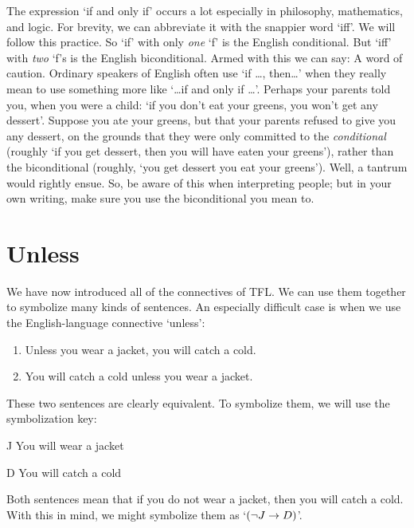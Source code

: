 The expression `if and only if' occurs a lot especially in philosophy, mathematics, and logic. For brevity, we can abbreviate it with the snappier word `iff'. We will follow this practice. So `if' with only \emph{one} `f' is the English conditional. But `iff' with \emph{two} `f's is the English biconditional. Armed with this we can say:
A word of caution. Ordinary speakers of English often use `if \ldots, then\ldots' when they really mean to use something more like `\ldots if and only if \ldots'. Perhaps your parents told you, when you were a child: `if you don't eat your greens, you won't get any dessert'. Suppose you ate your greens, but that your parents refused to give you any dessert, on the grounds that they were only committed to the \emph{conditional} (roughly `if you get dessert, then you will have eaten your greens'), rather than the biconditional (roughly, `you get dessert \ifeff{} you eat your greens'). Well, a tantrum would rightly ensue. So, be aware of this when interpreting people; but in your own writing, make sure you use the biconditional \ifeff{} you mean to.

\section{Unless}
We have now introduced all of the connectives of TFL. We can use them together to symbolize many kinds of sentences. An especially difficult case is when we use the English-language connective `unless':

\begin{enumerate}
\item\label{unless1} Unless you wear a jacket, you will catch a cold.
\item\label{unless2} You will catch a cold unless you wear a jacket.
\end{enumerate}
These two sentences are clearly equivalent. To symbolize them, we will use the symbolization key:
	\begin{ekey}
		\item[J] You will wear a jacket
		\item[D] You will catch a cold
	\end{ekey}
Both sentences mean that if you do not wear a jacket, then you will catch a cold. With this in mind, we might symbolize them as `$(\neg J \rightarrow D)$'.

